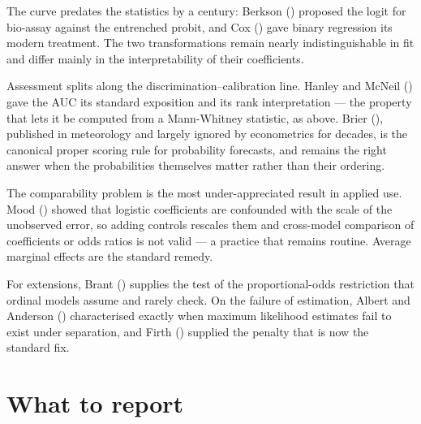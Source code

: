 \documentclass[
  letterpaper,
  10pt,
  twoside,
  openright,
  numbers=noenddot,
  chapterprefix=true]{scrbook}
\begin{document}
\begin{qmiblit}

The curve predates the statistics by a century: Berkson
() proposed the logit for bio-assay
against the entrenched probit, and Cox ()
gave binary regression its modern treatment. The two transformations
remain nearly indistinguishable in fit and differ mainly in the
interpretability of their coefficients.

Assessment splits along the discrimination--calibration line. Hanley and
McNeil () gave the AUC its standard
exposition and its rank interpretation --- the property that lets it be
computed from a Mann-Whitney statistic, as above. Brier
(), published in meteorology and largely
ignored by econometrics for decades, is the canonical proper scoring
rule for probability forecasts, and remains the right answer when the
probabilities themselves matter rather than their ordering.

The comparability problem is the most under-appreciated result in
applied use. Mood () showed that logistic
coefficients are confounded with the scale of the unobserved error, so
adding controls rescales them and cross-model comparison of coefficients
or odds ratios is not valid --- a practice that remains routine. Average
marginal effects are the standard remedy.

For extensions, Brant () supplies the test
of the proportional-odds restriction that ordinal models assume and
rarely check. On the failure of estimation, Albert and Anderson
() characterised exactly when maximum
likelihood estimates fail to exist under separation, and Firth
() supplied the penalty that is now the
standard fix.

\end{qmiblit}

\section{What to report}\label{what-to-report-2}
\end{document}
